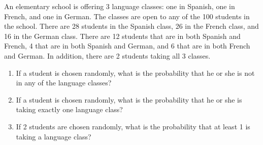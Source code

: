 \documentclass{article}[12pt]
\newenvironment{problem}[1]
  {\renewcommand\theinnercustomprblm{#1}\innercustomprblm}
  {\endinnercustomprblm}
\begin{document}
\begin{problem}{12}\normalfont
An elementary school is offering 3 language classes: one in Spanish, one in French, and one in German.
The classes are open to any of the 100 students in the school.
There are 28 students in the Spanish class, 26 in the French class, and 16 in the German class.
There are 12 students that are in both Spanish and French, 4 that are in both Spanish and German, and 6 that are in both French and German.
In addition, there are 2 students taking all 3 classes.
\begin{enumerate}[label=(\alph*)]
    \item If a student is chosen randomly, what is the probability that he or she is not in any of the language classes?
    \item If a student is chosen randomly, what is the probability that he or she is taking exactly one language class?
    \item If 2 students are chosen randomly, what is the probability that at least 1 is taking a language class?
\end{enumerate}
\end{problem}
\end{document}
